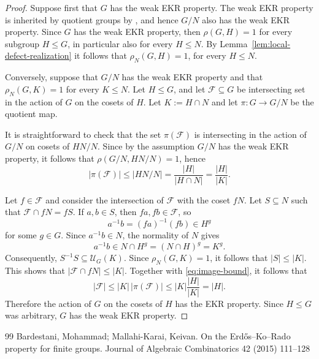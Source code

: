 \documentclass[10pt,a4paper]{amsart}
\begin{document}
\begin{proof}
Suppose first that \(G\) has the weak EKR property. The weak EKR
property is inherited by quotient groups by \cite[Lemma 4]{BardestaniMallahiKarai2015}, and hence \(G/N\) also has the
weak EKR property. Since $G$ has the weak EKR property, then $\rho(G,H)=1$ for every subgroup $H\leq G$, in particular also for every $H\leq N$. By Lemma~\ref{lem:local-defect-realization} it follows that $\rho_N(G,H)=1$, for every $H\leq N$.


Conversely, suppose that \(G/N\) has the weak EKR property and that
\(
\rho_N(G,K)=1\)
for every \(K\leq N.
\)
Let \(H\leq G\), and let \(\mathcal{F}\subseteq G\) be intersecting set in
the action of \(G\) on the cosets of \(H\). Let
\(
K:=H\cap N
\)
and let
\(
\pi:G\rightarrow G/N
\)
be the quotient map.

It is straightforward to check that the set \(\pi(\mathcal{F})\) is intersecting in the action
of \(
G/N \) on  cosets of $HN/N$.
Since by the assumption \(G/N\) has the weak EKR property, it follows that $\rho(G/N,HN/N)=1$, hence
\begin{equation}    
|\pi(\mathcal{F})|
 \leq
 |HN/N|
 =
 \frac{|H|}{|H\cap N|}
 =
 \frac{|H|}{|K|}.
\label{eq:image-bound}
\end{equation}

Let $f\in \mathcal{F}$ and consider the intersection of $\mathcal{F}$ with the coset $fN$.  Let $S\subseteq N$ such that $\mathcal{F} \cap fN=fS$. If \(a,b\in S\), then \(fa,fb\in
\mathcal{F}\), so
\[
a^{-1}b=(fa)^{-1}(fb)\in H^g
\]
for some \(g\in G\). Since \(a^{-1}b\in N\), the normality of \(N\) gives
\[
a^{-1}b
 \in
 N\cap H^g
 =
 (N\cap H)^g
 =
 K^g.
\]
Consequently,
\(
S^{-1}S\subseteq \mathcal{U}_G(K).
\)
Since \(\rho_N(G,K)=1\), it follows that
\(
|S|
 \leq |K|.
\) 
This shows that $|\mathcal{F}\cap fN|\leq |K|$.
Together with \eqref{eq:image-bound}, it follows that
\[
|\mathcal{F}|
 \leq
 |K|\,|\pi(\mathcal{F})|
 \leq
 |K|\frac{|H|}{|K|}
 =
 |H|.
\]
Therefore the action of \(G\) on the cosets of \(H\) has the EKR property. Since
\(H\leq G\) was arbitrary, \(G\) has the weak EKR property.
\end{proof}


\begin{thebibliography}{99}
 Bardestani, Mohammad; Mallahi-Karai, Keivan. On the {Erd\H{o}s--Ko--Rado} property for finite groups. Journal of Algebraic Combinatorics 42 (2015) 111--128
\end{thebibliography}
\end{document}
